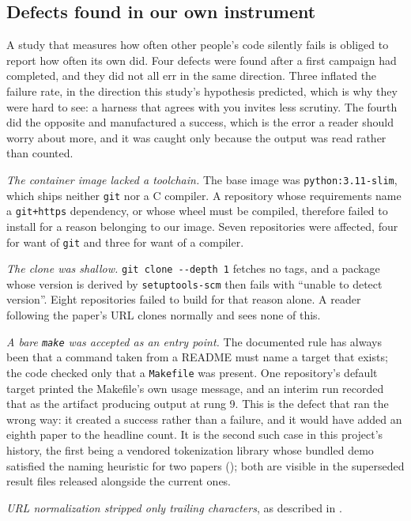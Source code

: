 \subsection{Defects found in our own instrument}\label{sec:harness_defects}

A study that measures how often other people's code silently fails is obliged to
report how often its own did. Four defects were found after a first campaign had
completed, and they did not all err in the same direction. Three inflated the
failure rate, in the direction this study's hypothesis predicted, which is why
they were hard to see: a harness that agrees with you invites less scrutiny. The
fourth did the opposite and manufactured a success, which is the error a reader
should worry about more, and it was caught only because the output was read
rather than counted.

\emph{The container image lacked a toolchain.} The base image was
\texttt{python:3.11-slim}, which ships neither \texttt{git} nor a C compiler. A
repository whose requirements name a \texttt{git+https} dependency, or whose
wheel must be compiled, therefore failed to install for a reason belonging to our
image. Seven repositories were affected, four for want of \texttt{git} and three
for want of a compiler.

\emph{The clone was shallow.} \texttt{git clone -{}-depth 1} fetches no tags, and a
package whose version is derived by \texttt{setuptools-scm} then fails with
``unable to detect version''. Eight repositories failed to build for that reason
alone. A reader following the paper's URL clones normally and sees none of this.

\emph{A bare \texttt{make} was accepted as an entry point.} The documented rule
has always been that a command taken from a README must name a target that
exists; the code checked only that a \texttt{Makefile} was present. One
repository's default target printed the Makefile's own usage message, and an
interim run recorded that as the artifact producing output at rung 9. This is the
defect that ran the wrong way: it created a success rather than a failure, and it
would have added an eighth paper to the headline count. It is the second such
case in this project's history, the first being a vendored tokenization library
whose bundled demo satisfied the naming heuristic for two papers
(); both are visible in the superseded result files released
alongside the current ones.

\emph{URL normalization stripped only trailing characters}, as described in
.

